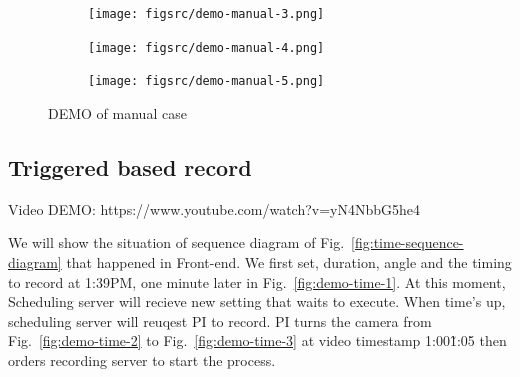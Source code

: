 \begin{figure}[H]
    \ContinuedFloat
    \centering
    \begin{subfigure}{\textwidth}
        \texttt{[image: figsrc/demo-manual-3.png]}
        \label{fig:demo-manual-3}
    \end{subfigure}
\end{figure}

\begin{figure}[H]
    \ContinuedFloat
    \centering
    \begin{subfigure}{\textwidth}
        \texttt{[image: figsrc/demo-manual-4.png]}
        \label{fig:demo-manual-4}
    \end{subfigure}
\end{figure}


\begin{figure}[H]
    \ContinuedFloat
    \centering
    \begin{subfigure}{\textwidth}
        \texttt{[image: figsrc/demo-manual-5.png]}
        \label{fig:demo-manual-5}
    \end{subfigure}

    \caption{DEMO of manual case}
    \label{fig:demo-manual}
\end{figure}

\subsection{Triggered based record}
Video DEMO: https://www.youtube.com/watch?v=yN4NbbG5he4

We will show the situation of sequence diagram of Fig.~\ref{fig:time-sequence-diagram} that happened in Front-end. We first set, duration, angle and the timing to record at 1:39PM, one minute later in Fig.~\ref{fig:demo-time-1}. At this moment, Scheduling server will recieve new setting that waits to execute. When time's up, scheduling server will reuqest PI to record. PI turns the camera from Fig.~\ref{fig:demo-time-2} to Fig.~\ref{fig:demo-time-3} at video timestamp 1:00\~1:05 then orders recording server to start the process.


